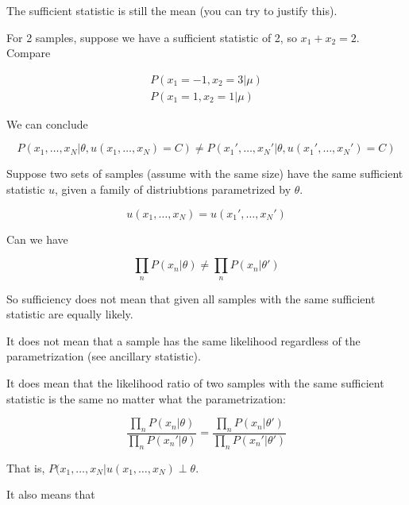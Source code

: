 \documentclass[a4paper]{article}
\begin{document}
The sufficient statistic is still the mean (you can try to justify this).

For 2 samples, suppose we have a sufficient statistic of 2, so $x_1 + x_2 = 2$.  Compare

\begin{equation}
  \begin{split}
    P( x_1 = -1, x_2 = 3 \vert \mu ) \\
    P( x_1 = 1, x_2 = 1 \vert \mu )
  \end{split}
  \label{}
\end{equation}

We can conclude

\begin{equation}
  P( x_1, \ldots, x_N \vert \theta, u(x_1,\ldots,x_N) = C ) \neq P( x_1', \ldots, x_N' \vert \theta, u(x_1',\ldots,x_N') = C )
  \label{}
\end{equation}

Suppose two sets of samples (assume with the same size) have the same sufficient statistic $u$, given a family of distriubtions parametrized by $\theta$.

\begin{equation}
  u(x_1,\ldots,x_N) = u(x_1',\ldots,x_N')
  \label{}
\end{equation}

Can we have

\begin{equation}
  \prod_n P(x_n \vert \theta) \neq \prod_n P(x_n \vert \theta')
  \label{}
\end{equation}

So sufficiency does not mean that given all samples with the same sufficient statistic are equally likely.

It does not mean that a sample has the same likelihood regardless of the parametrization (see ancillary statistic).

It does mean that the likelihood ratio of two samples with the same sufficient statistic is the same no matter what the parametrization:

\begin{equation}
  \frac{\prod_n P(x_n \vert \theta) }{ \prod_n P( x_n' \vert \theta) } = \frac{\prod_n P( x_n \vert \theta') }{ \prod_n P( x_n' \vert \theta') }
  \label{}
\end{equation}

That is, $P( x_1, \ldots, x_N \vert u(x_1, \ldots, x_N) \perp \theta $.

It also means that 
\end{document}

